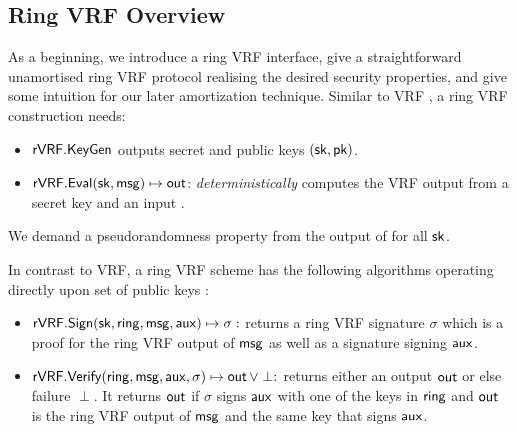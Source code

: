 \subsection{Ring VRF Overview}
\label{sec:overview}

As a beginning, we introduce a ring VRF interface, give a straightforward unamortised
 ring VRF protocol realising the desired security properties,
and give some intuition for our later amortization technique.
Similar to VRF \cite{vrf_micali}, a ring VRF construction needs: 

\begin{itemize}
\item ${\mathsf{rVRF}}.{\mathsf{KeyGen}} $ outputs secret and public keys $ (\mathsf{sk}, \mathsf{pk})$.

\item ${\mathsf{rVRF}}.{\mathsf{Eval}}(\mathsf{sk},\mathsf{msg}) \mapsto {\ensuremath{\mathsf{out}}}$:  \emph{deterministically} computes the VRF output \Out from a secret key \sk and an input \msg.
\end{itemize}
%


We demand a pseudorandomness property from the output of \Eval for all $ \mathsf{sk} $.


In contrast to VRF, a ring VRF scheme has the following algorithms operating directly upon
 set of public keys \ring:
\begin{itemize}
\item ${\mathsf{rVRF}}.{\mathsf{Sign}}(\mathsf{sk},\mathsf{ring},\mathsf{msg}, \mathsf{aux}) \mapsto \sigma:$
    returns a ring VRF signature $\sigma$ which is a proof for the ring VRF output of $ \mathsf{msg} $ as well as a signature signing $ \mathsf{aux} $.
\item ${\mathsf{rVRF}}.{\mathsf{Verify}}(\mathsf{ring},\mathsf{msg},\mathsf{aux},\sigma) \mapsto {\ensuremath{\mathsf{out}}} \, \lor \perp:$
    returns either an output ${\mathsf{out}}$ or else failure $\perp$. It returns $ {\mathsf{out}} $ if $ \sigma  $ signs $ \mathsf{aux} $ with one of the keys in $ \mathsf{ring} $ and $ {\mathsf{out}} $ is the ring VRF output of $ \mathsf{msg} $ and the same key that signs $ \mathsf{aux} $.
\end{itemize}


